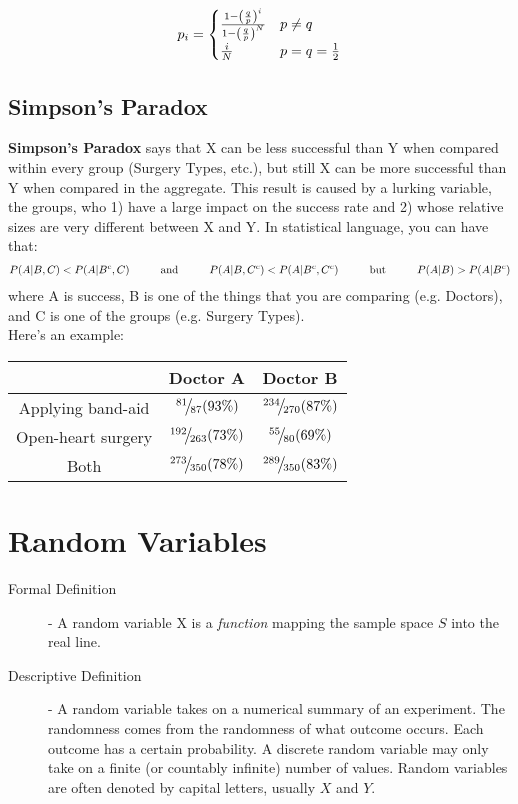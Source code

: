 \documentclass[11pt]{article}
\begin{document}
\begin{notes}
\[ p_i =
\begin{cases} 
      \frac{1 - \left( \frac{q}{p} \right)^i}{1 - \left( \frac{q}{p} \right)^N} & p \neq q \\
      \frac{i}{N} & p = q = \frac{1}{2}
\end{cases}
\]

\subsection*{Simpson's Paradox}
\textbf{Simpson's Paradox} says that X can be less successful than Y when compared within every group (Surgery Types, etc.), but still X can be more successful than Y when compared in the aggregate. This result is caused by a lurking variable, the groups, who 1) have a large impact on the success rate and 2) whose relative sizes are very different between X and Y. In statistical language, you can have that:
\begin{align*}
	P(A|B, C) < P(A|B^c, C) \hskip 1cm \textnormal{and}  \hskip 1cm P(A|B, C^c) < P(A|B^c, C^c)  \hskip 1cm \textnormal{but} \hskip 1cm P(A|B) > P(A|B^c)
\end{align*}
where A is success, B is one of the things that you are comparing (e.g. Doctors), and C is one of the groups (e.g. Surgery Types). \\
Here's an example:
\begin{center}
\begin{tabular}{c|c|c}
                    & Doctor A & Doctor B \\
 \hline
 Applying band-aid & $\slfrac{81}{87} \paren{93\%}$ & $\slfrac{234}{270} \paren{87\%}$ \\
 \hline
 Open-heart surgery & $\slfrac{192}{263} \paren{73\%}$ & $\slfrac{55}{80} \paren{69\%}$ \\
 \hline
 Both               & $\slfrac{273}{350} \paren{78\%}$ & $\slfrac{289}{350} \paren{83\%}$ \\
\end{tabular}
\end{center}

\section*{Random Variables}
\begin{description}
	\item[Formal Definition] - A random variable X is a \emph{function} mapping the sample space $S$ into the real line.
	\item[Descriptive Definition] - A random variable takes on a numerical summary of an experiment. The randomness comes from the randomness of what outcome occurs. Each outcome has a certain probability. A discrete random variable may only take on a finite (or countably infinite) number of values. Random variables are often denoted by capital letters, usually $X$ and $Y$.
\end{description}


\end{notes}
\end{document}
